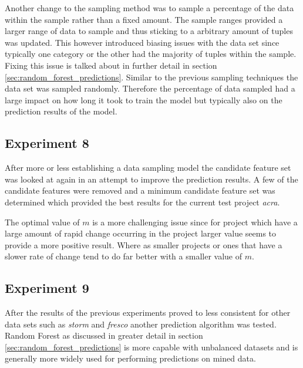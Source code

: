 Another change to the sampling method was to sample a percentage of the data within the sample rather than a fixed amount. The sample ranges provided a larger range of data to sample and thus sticking to a arbitrary amount of tuples was updated. This however introduced biasing issues with the data set since typically one category or the other had the majority of tuples within the sample. Fixing this issue is talked about in further detail in section \ref{sec:random_forest_predictions}. Similar to the previous sampling techniques the data set was sampled randomly. Therefore the percentage of data sampled had a large impact on how long it took to train the model but typically also on the prediction results of the model. 


\subsection{Experiment 8}

After more or less establishing a data sampling model the candidate feature set was looked at again in an attempt to improve the prediction results. A few of the candidate features were removed and a minimum candidate feature set was determined which provided the best results for the current test project \textit{acra}.



The optimal value of $m$ is a more challenging issue since for project which have a large amount of rapid change occurring in the project larger value seems to provide a more positive result. Where as smaller projects or ones that have a slower rate of change tend to do far better with a smaller value of $m$. 

\subsection{Experiment 9}

After the results of the previous experiments proved to less consistent for other data sets such as \textit{storm} and \textit{fresco} another prediction algorithm was tested. Random Forest as discussed in greater detail in section \ref{sec:random_forest_predictions} is more capable with unbalanced datasets and is generally more widely used for performing predictions on mined data. %

